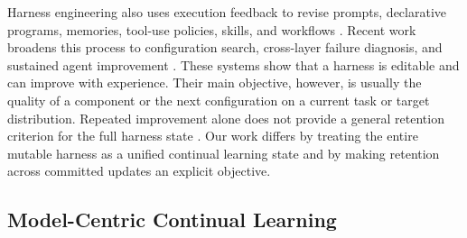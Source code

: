 \documentclass{article}
\begin{document}
Harness engineering also uses execution feedback to revise prompts,
declarative programs, memories, tool-use policies, skills, and workflows
\citep{zhou2023largelanguagemodelshumanlevel,
khattab2023dspycompilingdeclarativelanguage,
abuzakuk2026optimizingagenticworkflowsusing,
schick2023toolformerlanguagemodelsteach,shinn2023reflexion,voyager,
zhong2026skilllearnbenchbenchmarkingcontinuallearning,
zhang2026skillflowbenchmarkinglifelongskilldiscovery}. Recent work broadens this process to
configuration search, cross-layer failure diagnosis, and sustained agent
improvement
\citep{zhang2026selfharnessharnessesimprove,
chen2026failedtrajectoriesreliablellm,
yao2026harnessbenchmeasuringharnesseffects,
liu2026adaptiveautoharnesssustainedselfimprovement}. These systems show that a
harness is editable and can improve with experience. Their main objective,
however, is usually the quality of a component or the next configuration on a
current task or target distribution. Repeated improvement alone does not
provide a general retention criterion for the full harness state
\citep{lin2026harnessupdatingharnessbenefit}. Our work differs by treating the
entire mutable harness as a unified continual learning state and by making
retention across committed updates an explicit objective.

\subsection{Model-Centric Continual Learning}
\end{document}
